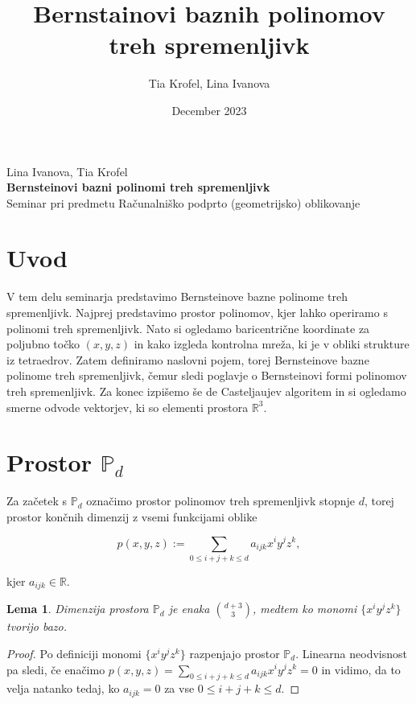 \documentclass[12pt,a4paper]{amsart}
\title{Bernstainovi baznih polinomov treh spremenljivk}
\author{Tia Krofel, Lina Ivanova}
\date{December 2023}
\theoremstyle{definition} %
\theoremstyle{plain} %
\newtheorem{lema}[definicija]{Lema}
\newcommand{\program}{Finančna matematika}
\newcommand{\imeavtorja}{Lina Ivanova, Tia Krofel}
\newcommand{\naslovdela}{Bernsteinovi bazni polinomi treh spremenljivk}
\begin{document}
\thispagestyle{empty}
\vfill

\begin{center}{\large
\imeavtorja\\[2mm]
{\bf \naslovdela}\\[10mm]
Seminar pri predmetu Računalniško podprto (geometrijsko) oblikovanje\\[1cm]
}
\end{center}
\vfill

\pagebreak

\section{Uvod}
V tem delu seminarja predstavimo Bernsteinove bazne polinome 
treh spremenljivk. Najprej predstavimo prostor polinomov,
kjer lahko operiramo s polinomi treh spremenljivk. Nato si ogledamo 
baricentrične koordinate za poljubno točko $(x,y,z)$ in kako izgleda 
kontrolna mreža, ki je v obliki strukture iz tetraedrov.
Zatem definiramo naslovni pojem, torej Bernsteinove bazne polinome 
treh spremenljivk, čemur sledi poglavje o Bernsteinovi formi polinomov 
treh spremenljivk. Za konec izpišemo še de Casteljaujev algoritem 
in si ogledamo smerne odvode vektorjev, ki so elementi prostora $\mathbb{R}^3$.

\section{Prostor $\mathbb{P}_d$}

Za začetek s $\mathbb{P}_d$ označimo prostor polinomov treh spremenljivk stopnje $d$, 
torej prostor končnih dimenzij z vsemi funkcijami oblike 

$$ p(x,y,z):=\sum_{0\leq i+j+k\leq d}a_{ijk}x^iy^jz^k,$$

kjer $a_{ijk}\in\mathbb{R}$.

\begin{lema}
    Dimenzija prostora $\mathbb{P}_d$ je enaka $\binom{d+3}{3}$,
    medtem ko monomi $\{x^iy^jz^k\}$ tvorijo bazo. 
\end{lema}

\begin{proof}
    Po definiciji monomi $\{x^iy^jz^k\}$ razpenjajo
    prostor $\mathbb{P}_d$.
    Linearna neodvisnost pa sledi, če enačimo
    $p(x,y,z)=\sum_{0\leq i+j+k\leq d}a_{ijk}x^iy^jz^k=0$
    in vidimo, da to velja natanko tedaj, ko 
    $a_{ijk}=0$ za vse $0\leq i+j+k\leq d$.
\end{proof}
\end{document}
